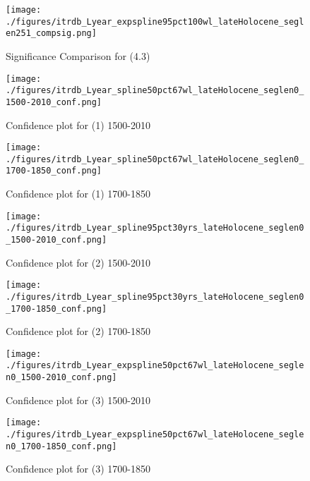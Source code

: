 \documentclass[smallextended]{svjour3}       %
\begin{document}
\begin{figure}[!tbp]
\centering
\texttt{[image: ./figures/itrdb\_Lyear\_expspline95pct100wl\_lateHolocene\_seglen251\_compsig.png]}

\noindent{}

\caption{Significance Comparison for (4.3)}

\label{compsig_4.3}
\end{figure}

\begin{figure}[!tbp]
\centering
\begin{minipage}[b]{0.45\textwidth}
\texttt{[image: ./figures/itrdb\_Lyear\_spline50pct67wl\_lateHolocene\_seglen0\_1500-2010\_conf.png]}
\caption{Confidence plot for (1) 1500-2010}
\label{conf_1_1500}
\end{minipage}
\hfill
\begin{minipage}[b]{0.45\textwidth}
\texttt{[image: ./figures/itrdb\_Lyear\_spline50pct67wl\_lateHolocene\_seglen0\_1700-1850\_conf.png]}
\caption{Confidence plot for (1) 1700-1850}
\label{conf_1_1700}
\end{minipage}
\end{figure}

\begin{figure}[!tbp]
\centering
\begin{minipage}[b]{0.45\textwidth}
\texttt{[image: ./figures/itrdb\_Lyear\_spline95pct30yrs\_lateHolocene\_seglen0\_1500-2010\_conf.png]}
\caption{Confidence plot for (2) 1500-2010}
\label{conf_2_1500}
\end{minipage}
\hfill
\begin{minipage}[b]{0.45\textwidth}
\texttt{[image: ./figures/itrdb\_Lyear\_spline95pct30yrs\_lateHolocene\_seglen0\_1700-1850\_conf.png]}
\caption{Confidence plot for (2) 1700-1850}
\label{conf_2_1700}
\end{minipage}
\end{figure}


\begin{figure}[!tbp]
\centering
\begin{minipage}[b]{0.45\textwidth}
\texttt{[image: ./figures/itrdb\_Lyear\_expspline50pct67wl\_lateHolocene\_seglen0\_1500-2010\_conf.png]}
\caption{Confidence plot for (3) 1500-2010}
\label{conf_3_1500}
\end{minipage}
\hfill
\begin{minipage}[b]{0.45\textwidth}
\texttt{[image: ./figures/itrdb\_Lyear\_expspline50pct67wl\_lateHolocene\_seglen0\_1700-1850\_conf.png]}
\caption{Confidence plot for (3) 1700-1850}
\label{conf_3_1700}
\end{minipage}
\end{figure}
\end{document}
